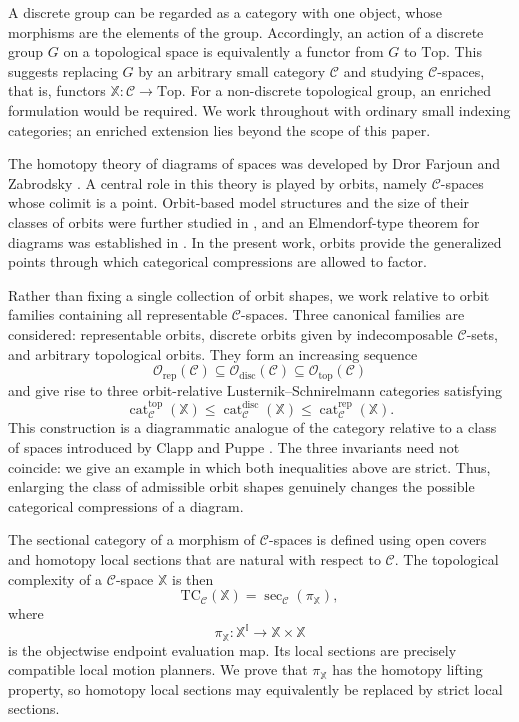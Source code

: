 \documentclass[12pt]{amsart}
\theoremstyle{definition}
\theoremstyle{remark}
\numberwithin{figure}{section}%
\newcommand{\CC}{\mathcal{C}}
\newcommand{\cat}{\mathop{\mathrm{cat}}}
\newcommand{\TC}{\mathrm{TC}}
\newcommand{\Top}{\mathrm{Top}}
\newcommand{\X}{\mathbb{X}}
\begin{document}
A discrete group can be regarded as a category with one object, whose
morphisms are the elements of the group. Accordingly, an action of a
discrete group $G$ on a topological space is equivalently a functor from
$G$ to $\Top$. This suggests replacing $G$ by an arbitrary small
category $\CC$ and studying $\CC$-spaces, that is, functors
$\X\colon\CC\to\Top$. For a non-discrete topological group, an enriched
formulation would be required. We work throughout with
ordinary small indexing categories; an enriched extension lies beyond
the scope of this paper.

The homotopy theory of diagrams of spaces was developed by Dror Farjoun
and Zabrodsky
\cite{Farjou_Zabrodsky,Farjoun_Hom,FarjounBig}. A central role in this
theory is played by orbits, namely $\CC$-spaces whose colimit is a point.
Orbit-based model structures and the size of their classes of orbits
were further studied in \cite{Chorny2003}, and an Elmendorf-type theorem
for diagrams was established in \cite{Housden}. In the present work,
orbits provide the generalized points through which categorical
compressions are allowed to factor.

Rather than fixing a single collection of orbit shapes, we work relative
to orbit families containing all representable $\CC$-spaces. Three
canonical families are considered: representable orbits, discrete
orbits given by indecomposable $\CC$-sets, and arbitrary topological
orbits. They form an increasing sequence
\[
\mathcal O_{\mathrm{rep}}(\CC)
\subseteq
\mathcal O_{\mathrm{disc}}(\CC)
\subseteq
\mathcal O_{\mathrm{top}}(\CC)
\]
and give rise to three orbit-relative
Lusternik--Schnirelmann categories satisfying
\[
\cat_{\CC}^{\mathrm{top}}(\X)
\leq
\cat_{\CC}^{\mathrm{disc}}(\X)
\leq
\cat_{\CC}^{\mathrm{rep}}(\X).
\]
This construction is a diagrammatic analogue of the category relative
to a class of spaces introduced by Clapp and Puppe
\cite{ClappPuppe1986}. The three invariants need not coincide: we give
an example in which both inequalities above are strict. Thus, enlarging
the class of admissible orbit shapes genuinely changes the possible
categorical compressions of a diagram.

The sectional category of a morphism of $\CC$-spaces is defined using
open covers and homotopy local sections that are natural with respect to
$\CC$. The topological complexity of a $\CC$-space $\X$ is then
\[
\TC_{\CC}(\X)=\sec_{\CC}(\pi_{\X}),
\]
where
\[
\pi_{\X}\colon\X^{\mathbb I}\longrightarrow\X\times\X
\]
is the objectwise endpoint evaluation map. Its local sections are
precisely compatible local motion planners. We prove that
$\pi_{\X}$ has the homotopy lifting property, so homotopy local sections
may equivalently be replaced by strict local sections.
\end{document}
